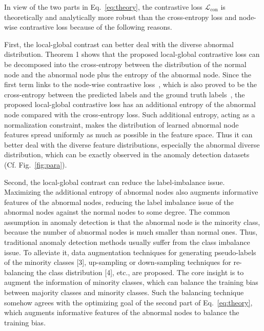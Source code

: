 In view of the two parts in Eq.~\eqref{eq:theory}, the contrastive loss $\mathcal{L}_{\text{con}}$ is theoretically and analytically more robust than the cross-entropy loss and node-wise contrastive loss because of the following reasons.


First, the local-global contrast can better deal with the diverse abnormal distribution. Theorem 1 shows that the proposed local-global contrastive loss can be decomposed into the cross-entropy between the distribution of the normal node and the abnormal node plus the entropy of the abnormal node. Since the first term links to the node-wise contrastive loss~\cite{boudiaf2020unifying}, which is also proved to be the cross-entropy between the predicted labels and the ground truth labels~\cite{boudiaf2020unifying}, the proposed local-global contrastive loss has an additional entropy of the abnormal node compared with the cross-entropy loss. Such additional entropy, acting as a normalization constraint, makes the distribution of learned abnormal node features spread uniformly as much as possible in the feature space. 
Thus it can better deal with the diverse feature distributions, especially the abnormal diverse distribution, which can be exactly observed in the anomaly detection datasets (Cf. Fig.~\ref{fig:para}). 


Second, the local-global contrast can reduce the label-imbalance issue. Maximizing the additional entropy of abnormal nodes also augments informative features of the abnormal nodes, reducing the label imbalance issue of the abnormal nodes against the normal nodes to some degree. The common assumption in anomaly detection is that the abnormal node is the minority class, because the number of abnormal nodes is much smaller than normal ones. Thus, traditional anomaly detection methods usually suffer from the class imbalance issue. To alleviate it, data augmentation techniques for generating pseudo-labels of the minority classes [3], up-sampling or down-sampling techniques for re-balancing the class distribution [4], etc., are proposed. The core insight is to augment the information of minority classes, which can balance the training bias between majority classes and minority classes. Such the balancing technique somehow agrees with the optimizing goal of the second part of Eq.~\eqref{eq:theory}, which augments informative features of the abnormal nodes to balance the training bias.
                                          



